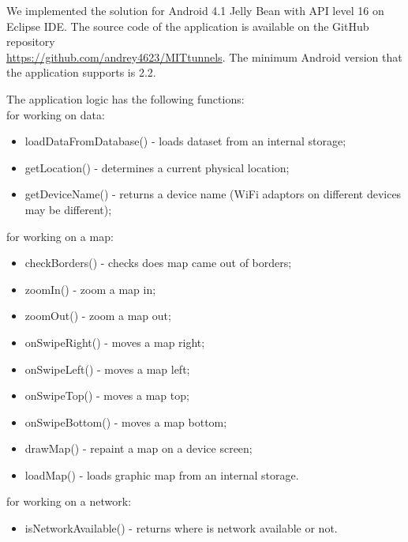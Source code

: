 \documentclass[11pt]{article}
\begin{document}
We implemented the solution for Android 4.1 Jelly Bean with API level 16 on Eclipse IDE. The source code of the application is available on the GitHub repository \\
\url{https://github.com/andrey4623/MITtunnels}. 
The minimum Android version that the application supports is 2.2.

The application logic has the following functions:\\
for working on data:
\begin{itemize}
\item loadDataFromDatabase() - loads dataset from an internal storage;
\item getLocation() - determines a current physical location;
\item getDeviceName() - returns a device name (WiFi adaptors on different devices may be different);
\end{itemize}
for working on a map:
\begin{itemize}
\item checkBorders() - checks does map came out of borders;
\item zoomIn() - zoom a map in;
\item zoomOut() - zoom a map out;
\item onSwipeRight() - moves a map right;
\item onSwipeLeft() - moves a map left;
\item onSwipeTop() - moves a map top;
\item onSwipeBottom() - moves a map bottom;
\item drawMap() - repaint a map on a device screen;
\item loadMap() - loads graphic map from an internal storage.
\end{itemize}

for working on a network:
\begin{itemize}
\item isNetworkAvailable() - returns where is network available or not.
\end{itemize} 
\end{document}
